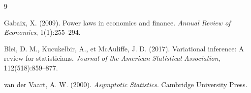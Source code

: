 \documentclass[letterpaper]{article}
\begin{document}
\begin{thebibliography}{9}

Gabaix, X. (2009).
Power laws in economics and finance.
\textit{Annual Review of Economics}, 1(1):255--294.

Blei, D. M., Kucukelbir, A., et McAuliffe, J. D. (2017).
Variational inference: A review for statisticians.
\textit{Journal of the American Statistical Association}, 112(518):859--877.

van der Vaart, A. W. (2000).
\textit{Asymptotic Statistics}.
Cambridge University Press.

\end{thebibliography}
\end{document}
